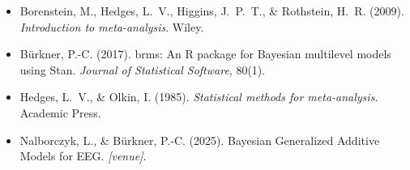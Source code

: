 \documentclass[11pt]{article}
\begin{document}
\begin{itemize}
\item Borenstein, M., Hedges, L.~V., Higgins, J.~P.~T., \&
  Rothstein, H.~R. (2009). \emph{Introduction to meta-analysis}.
  Wiley.
\item B\"urkner, P.-C. (2017). brms: An R package for Bayesian
  multilevel models using Stan. \emph{Journal of Statistical
  Software}, 80(1).
\item Hedges, L.~V., \& Olkin, I. (1985). \emph{Statistical
  methods for meta-analysis}. Academic Press.
\item Nalborczyk, L., \& B\"urkner, P.-C. (2025).
  Bayesian Generalized Additive Models for EEG. \emph{[venue]}.
\end{itemize}
\end{document}
